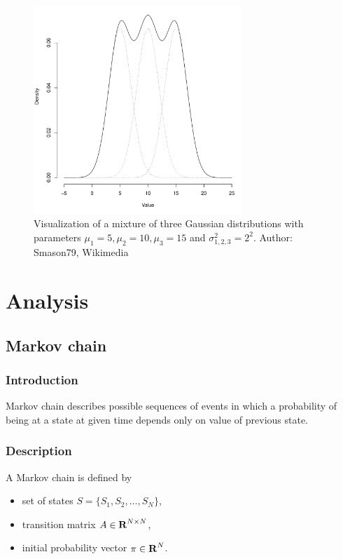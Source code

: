 \documentclass[thesis=B,english]{FITthesis}[2012/06/26]
\begin{document}
\begin{figure}
	\centering
 	\includegraphics[width=0.7\textwidth]{gaussian_mixture}
 	\caption{Visualization of a mixture of three Gaussian distributions with parameters $\mu_1=5, \mu_2=10, \mu_3=15$ and $\sigma_{1,2,3}^2=2^2$. Author: Smason79, Wikimedia}
 	\label{fig:gaussian_mixture}
\end{figure}

\chapter{Analysis}

\section{Markov chain}

\subsection{Introduction}
Markov chain describes possible sequences of events in which a probability of being at a state at given time depends only on value of previous state. 

\subsection{Description}

A Markov chain is defined by

\begin{itemize}
\item set of states $S = \{S_1, S_2, \dots, S_N\}$,
\item transition matrix $A \in \textbf R^{N \times N}$,
\item initial probability vector $\pi \in \textbf R^N$.
\end{itemize}
\end{document}
